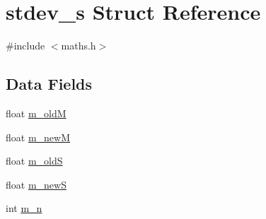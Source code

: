 \hypertarget{structstdev__s}{\section{stdev\+\_\+s Struct Reference}
\label{structstdev__s}
}


{\ttfamily \#include $<$maths.\+h$>$}

\subsection*{Data Fields}
\begin{DoxyCompactItemize}
\item 
float \hyperlink{structstdev__s_a5c2baaa26c3cdfa7387eb074e7de8e71}{m\+\_\+old\+M}
\item 
float \hyperlink{structstdev__s_af30f207db255dc25d5ae7b008a8e147d}{m\+\_\+new\+M}
\item 
float \hyperlink{structstdev__s_a77992b92cc7efdee4809637517d5491a}{m\+\_\+old\+S}
\item 
float \hyperlink{structstdev__s_ac31e66ce25dbf8e36ec279a0ac0018a5}{m\+\_\+new\+S}
\item 
int \hyperlink{structstdev__s_ae346e5cb7da1415967ea2314bcc11a30}{m\+\_\+n}
\end{DoxyCompactItemize}


